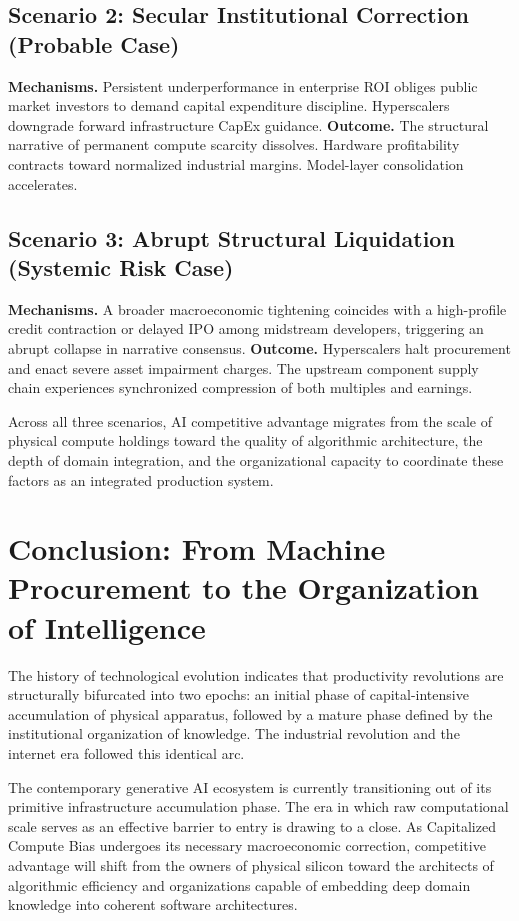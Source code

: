 \documentclass[11pt,letterpaper]{article}
\begin{document}
\subsection{Scenario 2: Secular Institutional Correction (Probable Case)}

\textbf{Mechanisms.} Persistent underperformance in enterprise ROI obliges public market investors to demand capital expenditure discipline. Hyperscalers downgrade forward infrastructure CapEx guidance. \textbf{Outcome.} The structural narrative of permanent compute scarcity dissolves. Hardware profitability contracts toward normalized industrial margins. Model-layer consolidation accelerates.

\subsection{Scenario 3: Abrupt Structural Liquidation (Systemic Risk Case)}

\textbf{Mechanisms.} A broader macroeconomic tightening coincides with a high-profile credit contraction or delayed IPO among midstream developers, triggering an abrupt collapse in narrative consensus. \textbf{Outcome.} Hyperscalers halt procurement and enact severe asset impairment charges. The upstream component supply chain experiences synchronized compression of both multiples and earnings.

Across all three scenarios, AI competitive advantage migrates from the scale of physical compute holdings toward the quality of algorithmic architecture, the depth of domain integration, and the organizational capacity to coordinate these factors as an integrated production system.

\section{Conclusion: From Machine Procurement to the Organization of Intelligence}

The history of technological evolution indicates that productivity revolutions are structurally bifurcated into two epochs: an initial phase of capital-intensive accumulation of physical apparatus, followed by a mature phase defined by the institutional organization of knowledge. The industrial revolution and the internet era followed this identical arc.

The contemporary generative AI ecosystem is currently transitioning out of its primitive infrastructure accumulation phase. The era in which raw computational scale serves as an effective barrier to entry is drawing to a close. As Capitalized Compute Bias undergoes its necessary macroeconomic correction, competitive advantage will shift from the owners of physical silicon toward the architects of algorithmic efficiency and organizations capable of embedding deep domain knowledge into coherent software architectures.
\end{document}
